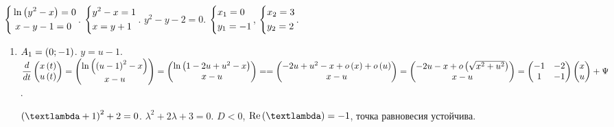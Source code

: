 \documentclass[a5paper,10pt]{article}
\begin{document}
$\left\{ \begin{aligned}& \ln\left(y^2 - x\right) = 0 \\&\ x - y - 1 = 0\end{aligned} \right.$. 
$\left\{ \begin{aligned}& y^2 - x = 1 \\& x = y + 1\end{aligned} \right.$.
$y^2 - y - 2 = 0$.
$\left\{ \begin{aligned}& x_{1} = 0 \\& y_{1} = -1\end{aligned} \right.$,
$\left\{ \begin{aligned}& x_{2} = 3 \\& y_{2} = 2\end{aligned} \right.$.

\begin{enumerate}
    \item $A_{1} = \left(0; -1\right)$. $y = u - 1$. 
    $\dfrac {d} {dt} \begin{pmatrix} x\br{t} \\ u\br{t} \end{pmatrix} 
    = \begin{pmatrix} \ln\br{\br{u - 1}^2 - x} \\ x - u \end{pmatrix}
    = \begin{pmatrix} \ln\br{1 - 2u + u^2 - x} \\ x - u \end{pmatrix}
    = \linebreak
    = \begin{pmatrix} -2u + u^2 - x + o\br{x} + o\br{u} \\ x - u \end{pmatrix}
    = \begin{pmatrix} -2u - x + o\br{\sqrt{x^2 + u^2}} \\ x - u \end{pmatrix}
    = \begin{pmatrix} -1 & -2 \\ 1 & -1 \end{pmatrix} \begin{pmatrix} x \\ u \end{pmatrix} + \Psi$.
    
    $\br{\lambda + 1}^2 + 2 = 0$.
    $\lambda^2 + 2\lambda + 3 = 0$.
    $D < 0$, $\Re\br{\lambda} = -1$, точка равновесия устойчива.
    

\end{enumerate}
\end{document}
